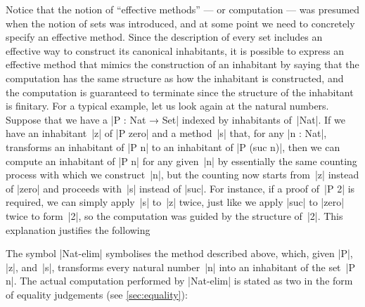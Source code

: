 Notice that the notion of ``effective methods'' --- or computation --- was presumed when the notion of sets was introduced, and at some point we need to concretely specify an effective method.
Since the description of every set includes an effective way to construct its canonical inhabitants, it is possible to express an effective method that mimics the construction of an inhabitant by saying that the computation has the same structure as how the inhabitant is constructed, and the computation is guaranteed to terminate since the structure of the inhabitant is finitary.
For a typical example, let us look again at the natural numbers.
Suppose that we have a  |P : Nat → Set| indexed by inhabitants of~|Nat|.
If we have an inhabitant~|z| of |P zero| and a method~|s| that, for any |n : Nat|, transforms an inhabitant of |P n| to an inhabitant of |P (suc n)|, then we can compute an inhabitant of |P n| for any given~|n| by essentially the same counting process with which we construct~|n|, but the counting now starts from~|z| instead of |zero| and proceeds with~|s| instead of |suc|.
For instance, if a proof of~|P 2| is required, we can simply apply~|s| to~|z| twice, just like we apply |suc| to |zero| twice to form~|2|, so the computation was guided by the structure of~|2|.
This explanation justifies the following 
\begin{center}
  
 \DP
\end{center}
The symbol |Nat-elim| symbolises the method described above, which, given |P|, |z|, and~|s|, transforms every natural number~|n| into an inhabitant of the set~|P n|.
The actual computation performed by |Nat-elim| is stated as two  in the form of equality judgements (see \autoref{sec:equality}):
\begin{center}
  
 \DP
\end{center}
